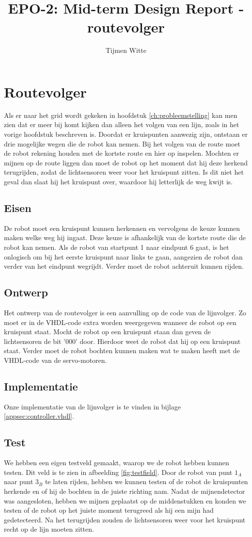 \documentclass{report}
\title{EPO-2: Mid-term Design Report - routevolger}
\author{Tijmen Witte}
\begin{document}
\chapter{Routevolger}
\label{ch:routevolger}

Als er naar het grid wordt gekeken in hoofdstuk \ref{ch:probleemstelling} kan men zien dat er meer bij komt kijken dan alleen het volgen van een lijn, zoals in het vorige hoofdstuk beschreven is.
Doordat er kruispunten aanwezig zijn, ontstaan er drie mogelijke wegen die de robot kan nemen.
Bij het volgen van de route moet de robot rekening houden met de kortste route en hier op inspelen.
Mochten er mijnen op de route liggen dan moet de robot op het moment dat hij deze herkend terugrijden, zodat de lichtsensoren weer voor het kruispunt zitten.
Is dit niet het geval dan slaat hij het kruispunt over, waardoor hij letterlijk de weg kwijt is.

\section{Eisen}
De robot moet een kruispunt kunnen herkennen en vervolgens de keuze kunnen maken welke weg hij ingaat.
Deze keuze is afhankelijk van de kortste route die de robot kan nemen.
Als de robot van startpunt 1 naar eindpunt 6 gaat, is het onlogisch om bij het eerste kruispunt naar links te gaan, aangezien de robot dan verder van het eindpunt wegrijdt.
Verder moet de robot achteruit kunnen rijden.

\section{Ontwerp}
Het ontwerp van de routevolger is een aanvulling op de code van de lijnvolger.
Zo moet er in de VHDL-code extra worden weergegeven wanneer de robot op een kruispunt staat.
Mocht de robot op een kruispunt staan dan geven de lichtsensoren de bit '000' door. Hierdoor weet de robot dat hij op een kruispunt staat.
Verder moet de robot bochten kunnen maken wat te maken heeft met de VHDL-code van de servo-motoren.

\section{Implementatie}
Onze implementatie van de lijnvolger is te vinden in bijlage \ref{appsec:controller.vhdl}.

\section{Test}
We hebben een eigen testveld gemaakt, waarop we de robot hebben kunnen testen.
Dit veld is te zien in afbeelding \ref{fig:testfield}.
Door de robot van punt $1_A$ naar punt $3_B$ te laten rijden, hebben we kunnen testen of de robot de kruispunten herkende en of hij de bochten in de juiste richting nam.
Nadat de mijnendetector was aangesloten, hebben we mijnen geplaatst op de middenstukken en konden we testen of de robot op het juiste moment terugreed als hij een mijn had gedetecteerd. Na het terugrijden zouden de lichtsensoren weer voor het kruispunt recht op de lijn moeten zitten.
\end{document}
